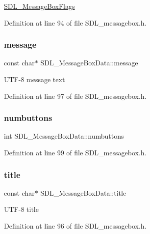 \mbox{\hyperlink{_s_d_l__messagebox_8h_a97f06819ac610581044fdb93d81eed37}{S\+D\+L\+\_\+\+Message\+Box\+Flags}} 

Definition at line 94 of file S\+D\+L\+\_\+messagebox.\+h.

\mbox{\label{struct_s_d_l___message_box_data_ada6ae208a1f85adabbd7a7a08ca609c8}} 
\subsubsection{\texorpdfstring{message}{message}}
{\footnotesize\ttfamily const char$\ast$ S\+D\+L\+\_\+\+Message\+Box\+Data\+::message}

U\+T\+F-\/8 message text 

Definition at line 97 of file S\+D\+L\+\_\+messagebox.\+h.

\mbox{\label{struct_s_d_l___message_box_data_a133f4fef549cc0cb14b799af35f3dc5a}} 
\subsubsection{\texorpdfstring{numbuttons}{numbuttons}}
{\footnotesize\ttfamily int S\+D\+L\+\_\+\+Message\+Box\+Data\+::numbuttons}



Definition at line 99 of file S\+D\+L\+\_\+messagebox.\+h.

\mbox{\label{struct_s_d_l___message_box_data_a93ceeafeed20b553ad4c86c9be37f117}} 
\subsubsection{\texorpdfstring{title}{title}}
{\footnotesize\ttfamily const char$\ast$ S\+D\+L\+\_\+\+Message\+Box\+Data\+::title}

U\+T\+F-\/8 title 

Definition at line 96 of file S\+D\+L\+\_\+messagebox.\+h.


